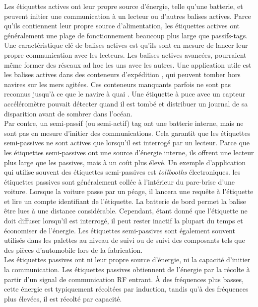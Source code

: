 \documentclass[11pt, a4paper, twoside]{book}
\begin{document}
 Les étiquettes actives ont leur propre source d'énergie, telle qu'une batterie, et peuvent initier une communication à un lecteur ou d'autres balises actives. Parce qu'ils contiennent leur propre source d'alimentation, les étiquettes actives ont généralement une plage de fonctionnement beaucoup plus large que passifs-tags. Une caractéristique clé de balises actives est qu'ils sont en mesure de lancer leur propre communication avec les lecteurs. Les balises actives avancées, pourraient même former des réseaux ad hoc les uns avec les autres. Une application utile est les balises actives dans des conteneurs d'expédition , qui peuvent tomber hors navires sur les mers agitées. Ces conteneurs manquants parfois ne sont pas reconnus jusqu'à ce que le navire à quai . Une étiquette à puce avec un capteur accéléromètre pouvait détecter quand il est tombé et distribuer un journal de sa disparition avant de sombrer dans l'océan.\\
 
Par contre, un semi-passif (ou semi-actif) tag ont une batterie interne, mais ne sont pas en mesure d'initier des communications. Cela garantit que les étiquettes semi-passives ne sont actives que lorsqu'il est interrogé par un lecteur. Parce que les étiquettes semi-passives ont une source d'énergie interne, ils offrent une lecteur plus large que les passives, mais à un coût plus élevé.
Un exemple d'application qui utilise souvent des étiquettes semi-passives est \emph {tollbooths} électroniques. les étiquettes passives sont généralement collée à l'intérieur du pare-brise d'une voiture. Lorsque la voiture passe par un péage, il lancera une requête à l'étiquette et lire un compte identifiant de l'étiquette. La batterie de bord permet la balise être lues à une distance considérable. Cependant, étant donné que l'étiquette ne doit diffuser lorsqu'il est interrogé, il peut rester inactif la plupart du temps et économiser de l'énergie. Les étiquettes semi-passives sont également souvent utilisés dans les palettes au niveau de suivi ou de suivi des composants tels que des pièces d'automobile lors de la fabrication.\\

Les étiquettes passives ont ni leur propre source d'énergie, ni la capacité d'initier la communication. Les étiquettes passives obtiennent de l'énergie par la récolte à partir d'un signal de communication RF entrant. À des fréquences plus basses, cette énergie est typiquement récoltées par induction, tandis qu'à des fréquences plus élevées, il est récolté par capacité.
\end{document}
